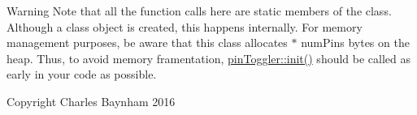 \begin{DoxyWarning}{Warning}
Note that all the function calls here are static members of the class. Although a class object is created, this happens internally. For memory management purposes, be aware that this class allocates { $\ast$ num\+Pins} bytes on the heap. Thus, to avoid memory framentation, \hyperlink{classpin_toggler_aa58211817601d0e2dd413eb63e41f773}{pin\+Toggler\+::init()} should be called as early in your code as possible.
\end{DoxyWarning}
\begin{DoxyCopyright}{Copyright}
Charles Baynham 2016 
\end{DoxyCopyright}
